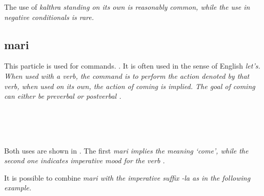 The use of \em kalthra \em standing on its own is reasonably common, while the use in negative conditionals is rare.

\subsection{mari}\label{sec:wc:mari}
This particle is used for commands. . It is often used in the sense of English \em let's\em. When used with a verb, the command is to perform the action denoted by that verb, when used on its own, the action of coming is implied. The goal of coming can either be preverbal  or postverbal .


\\


\\

 \\




Both uses are shown in  . The first \em mari \em implies the meaning `come', while the second one indicates imperative mood for the verb .


It is possible to combine \em mari \em with the imperative suffix \em -la \em as in the following example.


